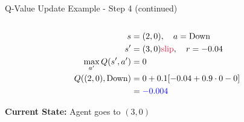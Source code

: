 \documentclass[aspectratio=169]{beamer}
\begin{document}
\begin{frame}{Q-Value Update Example - Step 4 (continued)}
\begin{columns}
        \begin{column}{0.5\textwidth}
            
            \begin{align}
                s &= (2,0), \quad a = \text{Down} \\
                s' &= (3,0) \text{\textcolor{red}{slip}}, \quad r = -0.04 \\
                \max_{a'}Q(s',a') &= 0 \\
                Q((2,0),\text{Down}) &= 0 + 0.1[-0.04 + 0.9 \cdot 0 - 0] \\
                &= \textcolor{blue}{-0.004}
            \end{align}
            
            \vspace{0.5cm}
            \textbf{Current State:} Agent goes to $(3,0)$
        \end{column}
    \end{columns}
\end{frame}
\end{document}
